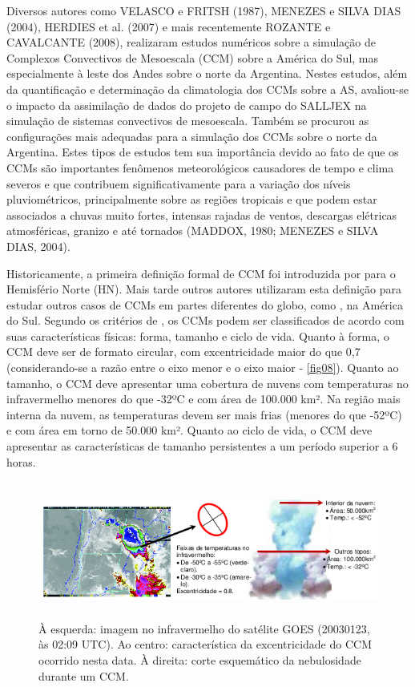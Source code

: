 Diversos autores como VELASCO e FRITSH (1987), MENEZES e SILVA DIAS (2004), HERDIES et al. (2007) e mais recentemente ROZANTE e CAVALCANTE (2008), realizaram estudos numéricos sobre a simulação de Complexos Convectivos de Mesoescala (CCM) sobre a América do Sul, mas especialmente à leste dos Andes sobre o norte da Argentina. Nestes estudos, além da quantificação e determinação da climatologia dos CCMs sobre a AS, avaliou-se o impacto da assimilação de dados do projeto de campo do SALLJEX na simulação de sistemas convectivos de mesoescala. Também  se procurou as configurações mais adequadas para a simulação dos CCMs sobre o norte da Argentina. Estes tipos de estudos tem sua importância devido ao fato de que os CCMs são importantes fenômenos meteorológicos causadores de tempo e clima severos e que contribuem significativamente para a variação dos níveis pluviométricos, principalmente sobre as regiões tropicais e que podem estar associados a chuvas muito fortes, intensas rajadas de ventos, descargas elétricas atmosféricas, granizo e até tornados (MADDOX, 1980; MENEZES e SILVA DIAS, 2004).

Historicamente, a primeira definição formal de CCM foi introduzida por  para o Hemisfério Norte (HN). Mais tarde outros autores utilizaram esta definição para estudar outros casos de CCMs em partes diferentes do globo, como , na América do Sul. Segundo os critérios de , os CCMs podem ser classificados de acordo com suas características físicas: forma, tamanho e ciclo de vida. Quanto à forma, o CCM deve ser de formato circular, com excentricidade maior do que 0,7 (considerando-se a razão entre o eixo menor e o eixo maior - \autoref{fig08}). Quanto ao tamanho, o CCM deve apresentar uma cobertura de nuvens com temperaturas no infravermelho menores do que -32ºC e com área de 100.000 km². Na região mais interna da nuvem, as temperaturas devem ser mais frias (menores do que -52ºC) e com área em torno de 50.000 km². Quanto ao ciclo de vida, o CCM deve apresentar as características de tamanho persistentes a um período superior a 6 horas.

\begin{figure}[!hbp]
\centering
\includegraphics[height=4.5cm]{./figs/fig08.png}
\caption{À esquerda: imagem no infravermelho do satélite GOES (20030123, às 02:09 UTC). Ao centro: característica da excentricidade do CCM ocorrido nesta data. À direita: corte esquemático da nebulosidade durante um CCM.}
\label{fig04}
\end{figure}

